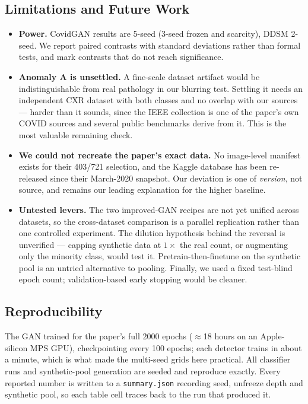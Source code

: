 \documentclass[11pt]{article}
\newcommand{\code}[1]{\texttt{#1}}
\begin{document}
\subsection{Limitations and Future Work}
\begin{itemize}[nosep, leftmargin=1.5em]
  \item \textbf{Power.} CovidGAN results are 5-seed (3-seed frozen and scarcity), DDSM 2-seed. We report paired contrasts with standard deviations rather than formal tests, and mark contrasts that do not reach significance.
  \item \textbf{Anomaly A is unsettled.} A fine-scale dataset artifact would be indistinguishable from real pathology in our blurring test. Settling it needs an independent CXR dataset with both classes and no overlap with our sources --- harder than it sounds, since the IEEE collection is one of the paper's own COVID sources and several public benchmarks derive from it. This is the most valuable remaining check.
  \item \textbf{We could not recreate the paper's exact data.} No image-level manifest exists for their 403/721 selection, and the Kaggle database has been re-released since their March-2020 snapshot. Our deviation is one of \emph{version}, not source, and remains our leading explanation for the higher baseline.
  \item \textbf{Untested levers.} The two improved-GAN recipes are not yet unified across datasets, so the cross-dataset comparison is a parallel replication rather than one controlled experiment. The dilution hypothesis behind the reversal is unverified --- capping synthetic data at $1\times$ the real count, or augmenting only the minority class, would test it. Pretrain-then-finetune on the synthetic pool is an untried alternative to pooling. Finally, we used a fixed test-blind epoch count; validation-based early stopping would be cleaner.
\end{itemize}

\subsection{Reproducibility}
The GAN trained for the paper's full 2000 epochs ($\approx$18 hours on an Apple-silicon MPS GPU), checkpointing every 100 epochs; each detector trains in about a minute, which is what made the multi-seed grids here practical. All classifier runs and synthetic-pool generation are seeded and reproduce exactly. Every reported number is written to a \code{summary.json} recording seed, unfreeze depth and synthetic pool, so each table cell traces back to the run that produced it.
\end{document}
